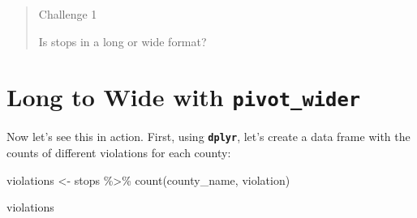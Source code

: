 \documentclass[
]{book}
\newenvironment{Shaded}{\begin{snugshade}}{\end{snugshade}}
\newcommand{\FunctionTok}[1]{\textcolor[rgb]{0.00,0.00,0.00}{#1}}
\newcommand{\NormalTok}[1]{#1}
\newcommand{\OtherTok}[1]{\textcolor[rgb]{0.56,0.35,0.01}{#1}}
\newcommand{\SpecialCharTok}[1]{\textcolor[rgb]{0.00,0.00,0.00}{#1}}
\begin{document}
\begin{quote}
Challenge 1

Is stops in a long or wide format?
\end{quote}

\hypertarget{long-to-wide-with-pivot_wider}{%
\section{\texorpdfstring{Long to Wide with \texttt{pivot\_wider}}{Long to Wide with pivot\_wider}}\label{long-to-wide-with-pivot_wider}}

Now let's see this in action. First, using \textbf{\texttt{dplyr}}, let's create a data frame with the counts of different violations for each county:

\begin{Shaded}
\begin{Highlighting}[]
\NormalTok{violations }\OtherTok{\textless{}{-}}\NormalTok{ stops }\SpecialCharTok{\%\textgreater{}\%}
  \FunctionTok{count}\NormalTok{(county\_name, violation)}

\NormalTok{violations}
\end{Highlighting}
\end{Shaded}
\end{document}

